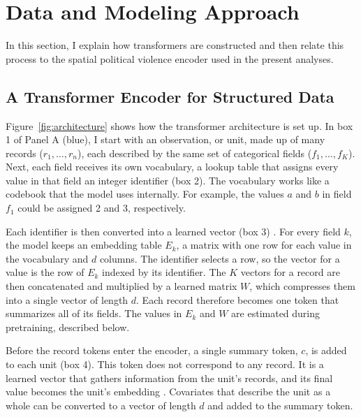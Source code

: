 \documentclass[11pt, letterpaper]{article}
\begin{document}
\section{Data and Modeling Approach}
\label{sec:data}
In this section, I explain how transformers are constructed and then relate this process to the spatial political violence encoder used in the present analyses. 

\subsection{A Transformer Encoder for Structured Data}
\label{sec:general_encoder}

Figure~\ref{fig:architecture} shows how the transformer architecture is set up. In box 1 of Panel A (blue), I start with an observation, or unit, made up of many records ($r_1, \ldots, r_n$), each described by the same set of categorical fields ($f_1, \ldots, f_K$). Next, each field receives its own vocabulary, a lookup table that assigns every value in that field an integer identifier (box 2). The vocabulary works like a codebook that the model uses internally. For example, the values $a$ and $b$ in field $f_1$ could be assigned 2 and 3, respectively.%

Each identifier is then converted into a learned vector (box 3) \citep{guo2016entity}. For every field $k$, the model keeps an embedding table $E_k$, a matrix with one row for each value in the vocabulary and $d$ columns. The identifier selects a row, so the vector for a value is the row of $E_k$ indexed by its identifier. The $K$ vectors for a record are then concatenated and multiplied by a learned matrix $W$, which compresses them into a single vector of length $d$. Each record therefore becomes one token that summarizes all of its fields. The values in $E_k$ and $W$ are estimated during pretraining, described below.



Before the record tokens enter the encoder, a single summary token, $c$, is added to each unit (box 4). This token does not correspond to any record. It is a learned vector that gathers information from the unit's records, and its final value becomes the unit's embedding \citep{devlin2019bert}. Covariates that describe the unit as a whole can be converted to a vector of length $d$ and added to the summary token.%
\end{document}
